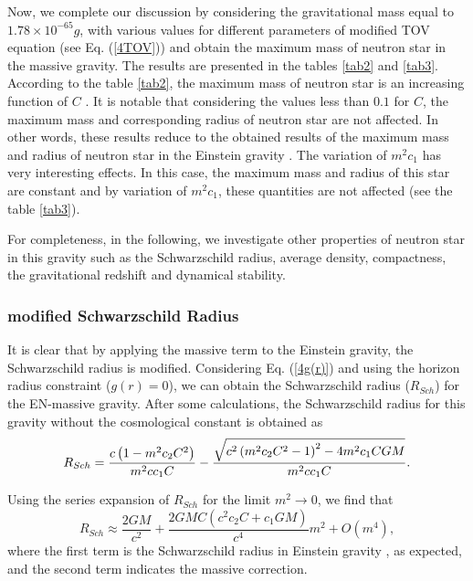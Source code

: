 \documentclass[aps]{revtex4}
\begin{document}
Now, we complete our discussion by considering the gravitational
mass equal to $1.78\times 10^{-65}g$, with various values for
different parameters of modified TOV equation (see Eq.
(\ref{4TOV})) and obtain the maximum mass of neutron star in the
massive gravity. The results are
presented in the tables \ref{tab2} and \ref{tab3}. According to the table %
\ref{tab2}, the maximum mass of neutron star is an increasing function of $C$%
. It is notable that considering the values less than $0.1$ for $C$, the
maximum mass and corresponding radius of neutron star are not affected. In
other words, these results reduce to the obtained results of the maximum
mass and radius of neutron star in the Einstein gravity \cite{BordbarH}. The
variation of $m^{2}c_{1}$ has very interesting effects. In this case, the
maximum mass and radius of this star are constant and by variation of $%
m^{2}c_{1}$, these quantities are not affected (see the table \ref{tab3}).

For completeness, in the following, we investigate other properties of
neutron star in this gravity such as the Schwarzschild radius, average
density, compactness, the gravitational redshift and dynamical stability.

\subsubsection{modified Schwarzschild Radius}

It is clear that by applying the massive term to the Einstein gravity, the
Schwarzschild radius is modified. Considering Eq. (\ref{4g(r)}) and using
the horizon radius constraint ($g(r)=0$), we can obtain the Schwarzschild
radius ($R_{Sch}$) for the EN-massive gravity. After some calculations, the
Schwarzschild radius for this gravity without the cosmological constant is
obtained as
\begin{equation}
R_{Sch}=\frac{c\left( 1-m^{2}c_{2}C^{2}\right) }{m^{2}cc_{1}C}-\frac{\sqrt{%
c^{2}\left( m^{2}c_{2}C^{2}-1\right) ^{2}-4m^{2}c_{1}CGM}}{m^{2}cc_{1}C}.
\label{Sch}
\end{equation}

Using the series expansion of $R_{Sch}$ for the limit $m^{2}\rightarrow 0$,
we find that
\begin{equation}
R_{Sch}\approx \frac{2GM}{c^{2}}+\frac{2GMC\left( c^{2}c_{2}C+c_{1}GM\right)
}{c^{4}}m^{2}+O(m^{4}),
\end{equation}%
where the first term is the Schwarzschild radius in Einstein gravity \cite%
{Schwarzschild}, as expected, and the second term indicates the massive
correction.
\end{document}
